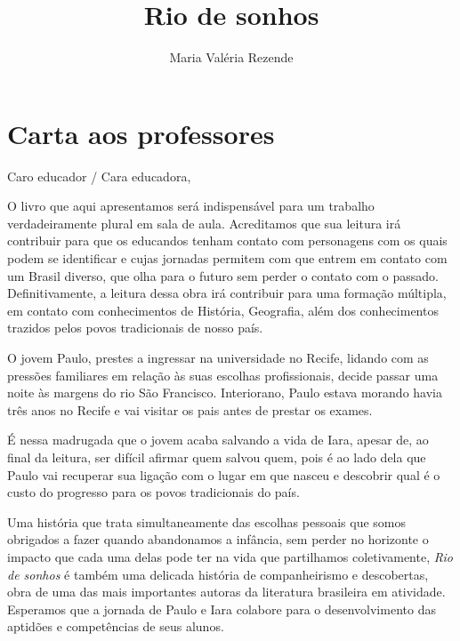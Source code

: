 \documentclass{extrarticle}
\begin{document}
\newcommand{\AutorLivro}{Maria Valéria Rezende}
\newcommand{\TituloLivro}{Rio de sonhos}
\newcommand{\Tema}{Ficção, mistério e fantasia}
\newcommand{\Genero}{Romance}
\newcommand{\issnppub}{---}
\newcommand{\issnepub}{---}
\newcommand{\colaborador}{\textbf{Raphaella Lira} é uma pessoa incrível e vai fazer um bom serviço.}


\title{\TituloLivro}
\author{\AutorLivro}
\def\authornotes{\colaborador}

\date{}
\maketitle
\tableofcontents


\pagebreak

\section{Carta aos professores}

Caro educador / Cara educadora,\\\bigskip

O livro que aqui apresentamos será indispensável para um trabalho
verdadeiramente plural em sala de aula. Acreditamos que sua leitura irá
contribuir para que os educandos tenham contato com personagens com os
quais podem se identificar e cujas jornadas permitem com que entrem em
contato com um Brasil diverso, que olha para o futuro sem perder o
contato com o passado. Definitivamente, a leitura dessa obra irá
contribuir para uma formação múltipla, em contato com conhecimentos de
História, Geografia, além dos conhecimentos trazidos pelos povos
tradicionais de nosso país.

O jovem Paulo, prestes a ingressar na universidade no Recife, lidando
com as pressões familiares em relação às suas escolhas profissionais,
decide passar uma noite às margens do rio São Francisco. Interiorano,
Paulo estava morando havia três anos no Recife e vai visitar os pais
antes de prestar os exames.

É nessa madrugada que o jovem acaba salvando a vida de Iara, apesar de,
ao final da leitura, ser difícil afirmar quem salvou quem, pois é ao
lado dela que Paulo vai recuperar sua ligação com o lugar em que nasceu
e descobrir qual é o custo do progresso para os povos tradicionais do
país.

Uma história que trata simultaneamente das escolhas pessoais que somos
obrigados a fazer quando abandonamos a infância, sem perder no horizonte
o impacto que cada uma delas pode ter na vida que partilhamos
coletivamente, \emph{Rio de sonhos} é também uma delicada história de
companheirismo e descobertas, obra de uma das mais importantes autoras
da literatura brasileira em atividade. Esperamos que a jornada de Paulo
e Iara colabore para o desenvolvimento das aptidões e competências de
seus alunos.
\end{document}
